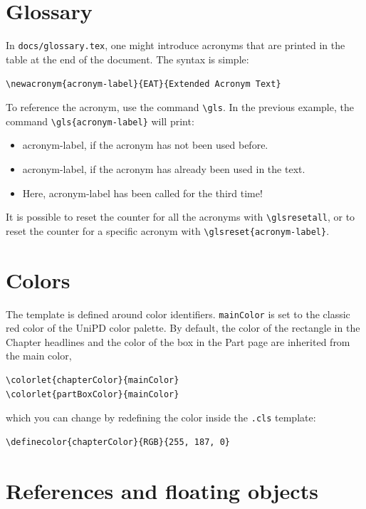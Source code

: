 \section{Glossary}

In \texttt{docs/glossary.tex}, one might introduce acronyms that are printed in the table at the end of the document. The syntax is simple:

\begin{center}
    \verb|\newacronym{acronym-label}{EAT}{Extended Acronym Text}|
\end{center}

To reference the acronym, use the command \verb|\gls|. 
In the previous example, the command \verb|\gls{acronym-label}| will print:
\begin{itemize}
    \item \gls{acronym-label}, if the acronym has not been used before.
    \item \gls{acronym-label}, if the acronym has already been used in the text.
    \item Here, \gls{acronym-label} has been called for the third time!
\end{itemize}

It is possible to reset the counter for all the acronyms with \verb|\glsresetall|, or to reset the counter for a specific acronym with \verb|\glsreset{acronym-label}|.

\section{Colors}\label{sec:color}

The template is defined around color identifiers. \texttt{mainColor} is set to the classic red color of the UniPD color palette.
By default, the color of the rectangle in the Chapter headlines and the color of the box in the Part page are inherited from the main color,
\begin{lstlisting}[language={[latex]TeX}]
\colorlet{chapterColor}{mainColor}
\colorlet{partBoxColor}{mainColor}
\end{lstlisting}
which you can change by redefining the color inside the \texttt{.cls} template:
\begin{lstlisting}[language={[latex]TeX}]
\definecolor{chapterColor}{RGB}{255, 187, 0}
\end{lstlisting}


\section{References and floating objects}

